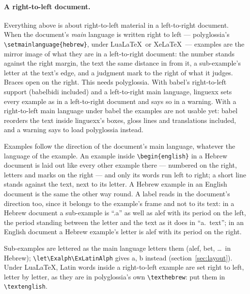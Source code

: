 \documentclass[11pt,a4paper]{article}
\newcommand{\cs}[1]{\texttt{\textbackslash #1}}
\newcommand{\pkg}[2][]{\textsf{#2}}
\begin{document}
\paragraph{A right-to-left document.} Everything above is about
right-to-left material in a left-to-right document. When the document's
\emph{main} language is written right to left --- \pkg{polyglossia}'s
\cs{setmainlanguage}\verb|{hebrew}|, under Lua\LaTeX\ or Xe\LaTeX\ ---
examples are the mirror image of what they are in a left-to-right
document: the number stands against the right margin, the text the same
distance in from it, a sub-example's letter at the text's edge, and a
judgment mark to the right of what it judges. Braces open on the right.
This needs \pkg{polyglossia}. With \pkg{babel}'s right-to-left support
(\pkg{babelbidi} included) and a left-to-right main language,
\pkg{linguexx} sets every example as in a left-to-right document and says
so in a warning. With a right-to-left main language under \pkg{babel} the
examples are not usable yet: \pkg{babel} reorders the text inside
\pkg{linguexx}'s boxes, gloss lines and translations included, and a
warning says to load \pkg{polyglossia} instead.

Examples follow the direction of the document's main language, whatever
the language of the example. An example inside
\verb|\begin{english}| in a Hebrew document is laid out like every other
example there --- numbered on the right, letters and marks on the right
--- and only its words run left to right; a short line stands against the
text, next to its letter. A Hebrew example in an English document is the
same the other way round. A label reads in the document's direction
too, since it belongs to the example's frame and not to its text: in a
Hebrew document a sub-example is ``.a'' as well as alef with its period
on the left, the period standing between the letter and the text as it
does in ``a.~text''; in an English document a Hebrew example's letter is
alef with its period on the right.

Sub-examples are lettered as the main language letters them (alef, bet,
\dots\ in Hebrew); \verb|\let\Exalph\ExLatinAlph| gives a, b instead
(section~\ref{sec:layout}). Under Lua\LaTeX, Latin words inside a
right-to-left example are set right to left, letter by letter, as they
are in \pkg{polyglossia}'s own \cs{texthebrew}: put them in
\cs{textenglish}.
\end{document}
